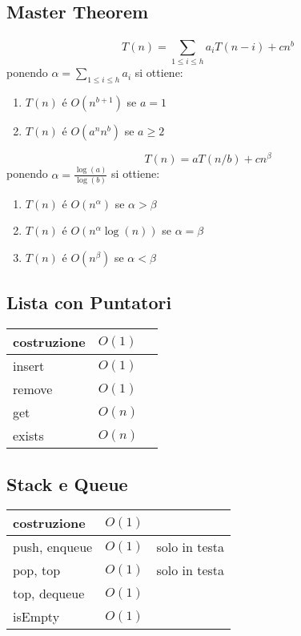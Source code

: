 \documentclass[12pt]{article}
\begin{document}
\newpage

\subsection*{Master Theorem}
\[
 T(n) = \sum_{1 \leq i \leq h}^{} a_i T(n-i) + cn^b
\]
ponendo $\alpha = \sum_{1 \leq i \leq h}^{} a_i$ si ottiene:
\begin{enumerate}[noitemsep]
	\item $T(n)$ \'e $O(n^{b+1})$ se $a = 1$
	\item $T(n)$ \'e $O(a^nn^b)$ se $a \geq 2$
\end{enumerate}


\[
 T(n) = a T(n/b) + cn^{\beta}
\]
ponendo $\alpha = \frac{\log(a)}{\log(b)}$ si ottiene:
\begin{enumerate}[noitemsep]
	\item $T(n)$ \'e $O(n^{\alpha})$ se $\alpha > \beta$
	\item $T(n)$ \'e $O(n^{\alpha}\log(n))$ se $\alpha = \beta$
	\item $T(n)$ \'e $O(n^{\beta})$ se $\alpha < \beta$
\end{enumerate}

\newpage
\subsection*{Lista con Puntatori}
\begin{tabularx}{\textwidth}{ p{6cm} p{2.7cm} | X }
    \hline
    	costruzione & $O(1)$ & \\ 
    \hline
		insert & $O(1)$ & \\
	\hline
		remove & $O(1)$ & \\ 
	\hline
		get & $O(n)$ & \\
	\hline
		exists & $O(n)$ & \\
	\hline
\end{tabularx}

\subsection*{Stack e Queue}
\begin{tabularx}{\textwidth}{ p{6cm} p{2.7cm} | X }
    \hline
    	costruzione & $O(1)$ & \\ 
    \hline
		push, enqueue & $O(1)$ & {\footnotesize solo in testa} \\
	\hline
		pop, top & $O(1)$ & {\footnotesize solo in testa} \\ 
	\hline
		top, dequeue & $O(1)$ & \\
	\hline
		isEmpty & $O(1)$ & \\
	\hline
\end{tabularx}
\end{document}
